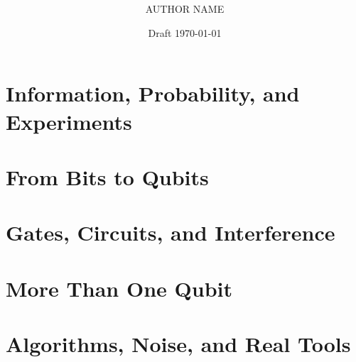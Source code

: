 \documentclass[11pt,openany]{book}
\title{\booktitle\\[4pt]\large\booksubtitle}
\author{AUTHOR NAME}
\date{Draft \today}
\begin{document}
\frontmatter
\maketitle


\tableofcontents


\mainmatter
\part{Information, Probability, and Experiments}



\part{From Bits to Qubits}



\part{Gates, Circuits, and Interference}




\part{More Than One Qubit}




\part{Algorithms, Noise, and Real Tools}




\appendix











\end{document}
